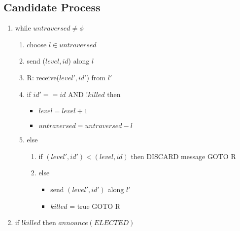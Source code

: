 \documentclass{article}
\begin{document}
\subsection*{Candidate Process}
\begin{enumerate}
    \item while \(untraversed \ne \phi\)
    \begin{enumerate}
        \item choose \(l \in untraversed\)
        \item send (\(level, id\)) along \(l\)
        \item R: receive(\(level', id'\)) from \(l'\)
        \item if \(id' == id\) AND \(!killed\) then
        \begin{itemize}
            \item \(level = level + 1\)
            \item \(untraversed = untraversed - l\)
        \end{itemize}
        \item else
        \begin{enumerate}
            \item if \((level', id') < (level, id)\) then DISCARD message GOTO R
            \item else 
            \begin{itemize}
                \item send \((level', id')\) along \(l'\)
                \item \(killed\) = true
                GOTO R
            \end{itemize}
        \end{enumerate}
    \end{enumerate}
    \item if \(!killed\) then \(announce(ELECTED)\)
\end{enumerate}
\end{document}
